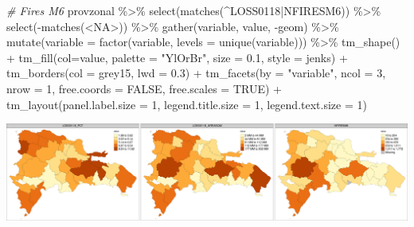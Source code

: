 \documentclass[10pt,landscape,a3paper]{article}
\newenvironment{Shaded}{\begin{snugshade}}{\end{snugshade}}
\newcommand{\AttributeTok}[1]{\textcolor[rgb]{0.77,0.63,0.00}{#1}}
\newcommand{\CommentTok}[1]{\textcolor[rgb]{0.56,0.35,0.01}{\textit{#1}}}
\newcommand{\ConstantTok}[1]{\textcolor[rgb]{0.00,0.00,0.00}{#1}}
\newcommand{\DecValTok}[1]{\textcolor[rgb]{0.00,0.00,0.81}{#1}}
\newcommand{\FloatTok}[1]{\textcolor[rgb]{0.00,0.00,0.81}{#1}}
\newcommand{\FunctionTok}[1]{\textcolor[rgb]{0.00,0.00,0.00}{#1}}
\newcommand{\NormalTok}[1]{#1}
\newcommand{\SpecialCharTok}[1]{\textcolor[rgb]{0.00,0.00,0.00}{#1}}
\newcommand{\StringTok}[1]{\textcolor[rgb]{0.31,0.60,0.02}{#1}}
\begin{document}
\begin{Shaded}
\begin{Highlighting}[]

\CommentTok{\# Fires M6}
\NormalTok{provzonal }\SpecialCharTok{\%\textgreater{}\%} \FunctionTok{select}\NormalTok{(}\FunctionTok{matches}\NormalTok{(}\StringTok{\textquotesingle{}\^{}LOSS0118|NFIRESM6\textquotesingle{}}\NormalTok{)) }\SpecialCharTok{\%\textgreater{}\%} \FunctionTok{select}\NormalTok{(}\SpecialCharTok{{-}}\FunctionTok{matches}\NormalTok{(}\StringTok{\textquotesingle{}\textless{}NA\textgreater{}\textquotesingle{}}\NormalTok{)) }\SpecialCharTok{\%\textgreater{}\%} 
  \FunctionTok{gather}\NormalTok{(variable, value, }\SpecialCharTok{{-}}\NormalTok{geom) }\SpecialCharTok{\%\textgreater{}\%}
  \FunctionTok{mutate}\NormalTok{(}\AttributeTok{variable =} \FunctionTok{factor}\NormalTok{(variable, }\AttributeTok{levels =} \FunctionTok{unique}\NormalTok{(variable))) }\SpecialCharTok{\%\textgreater{}\%} 
  \FunctionTok{tm\_shape}\NormalTok{() }\SpecialCharTok{+}
  \FunctionTok{tm\_fill}\NormalTok{(}\AttributeTok{col=}\StringTok{\textquotesingle{}value\textquotesingle{}}\NormalTok{, }\AttributeTok{palette =} \StringTok{"YlOrBr"}\NormalTok{, }\AttributeTok{size =} \FloatTok{0.1}\NormalTok{, }\AttributeTok{style =} \StringTok{\textquotesingle{}jenks\textquotesingle{}}\NormalTok{) }\SpecialCharTok{+}
  \FunctionTok{tm\_borders}\NormalTok{(}\AttributeTok{col =} \StringTok{\textquotesingle{}grey15\textquotesingle{}}\NormalTok{, }\AttributeTok{lwd =} \FloatTok{0.3}\NormalTok{) }\SpecialCharTok{+}
  \FunctionTok{tm\_facets}\NormalTok{(}\AttributeTok{by =} \StringTok{"variable"}\NormalTok{, }\AttributeTok{ncol =} \DecValTok{3}\NormalTok{, }\AttributeTok{nrow =} \DecValTok{1}\NormalTok{, }\AttributeTok{free.coords =} \ConstantTok{FALSE}\NormalTok{, }\AttributeTok{free.scales =} \ConstantTok{TRUE}\NormalTok{) }\SpecialCharTok{+}
  \FunctionTok{tm\_layout}\NormalTok{(}\AttributeTok{panel.label.size =} \DecValTok{1}\NormalTok{, }\AttributeTok{legend.title.size =} \DecValTok{1}\NormalTok{, }\AttributeTok{legend.text.size =} \DecValTok{1}\NormalTok{)}
\end{Highlighting}
\end{Shaded}

\begin{center}\includegraphics{img/data-download-preparation-eda/zonal-prov-6} \end{center}
\end{document}
